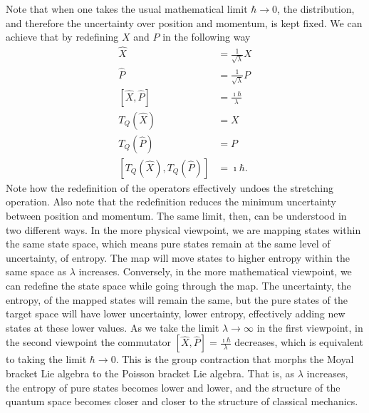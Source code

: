 \documentclass{article}
\begin{document}
Note that when one takes the usual mathematical limit $\hbar \to 0$, the distribution, and therefore the uncertainty over position and momentum, is kept fixed. We can achieve that by redefining $X$ and $P$ in the following way
\begin{align}
    \hat{X} &= \frac{1}{\sqrt{\lambda}} X \\
    \hat{P} &= \frac{1}{\sqrt{\lambda}} P \\
    [\hat{X}, \hat{P}] &= \frac{\imath \hbar}{\lambda} \\
    T_Q(\hat{X}) &=  X \\
    T_Q(\hat{P}) &=  P \\
    [T_Q(\hat{X}), T_Q(\hat{P})] &= \imath \hbar.
\end{align}
Note how the redefinition of the operators effectively undoes the stretching operation. Also note that the redefinition reduces the minimum uncertainty between position and momentum. The same limit, then, can be understood in two different ways. In the more physical viewpoint, we are mapping states within the same state space, which means pure states remain at the same level of uncertainty, of entropy. The map will move states to higher entropy within the same space as $\lambda$ increases. Conversely, in the more mathematical viewpoint, we can redefine the state space while going through the map. The uncertainty, the entropy, of the mapped states will remain the same, but the pure states of the target space will have lower  uncertainty, lower entropy, effectively adding new states at these lower values. As we take the limit $\lambda \to \infty$ in the first viewpoint, in the second viewpoint the commutator $[\hat{X},\hat{P}] = \frac{\imath \hbar}{\lambda}$ decreases, which is equivalent to taking the limit $\hbar \to 0$. This is the group contraction that morphs the Moyal bracket Lie algebra to the Poisson bracket Lie algebra.\cite{Moyal_1949,saletan1961contraction, inonu1953contraction} That is, as $\lambda$ increases, the entropy of pure states becomes lower and lower, and the structure of the quantum space becomes closer and closer to the structure of classical mechanics.
\end{document}
